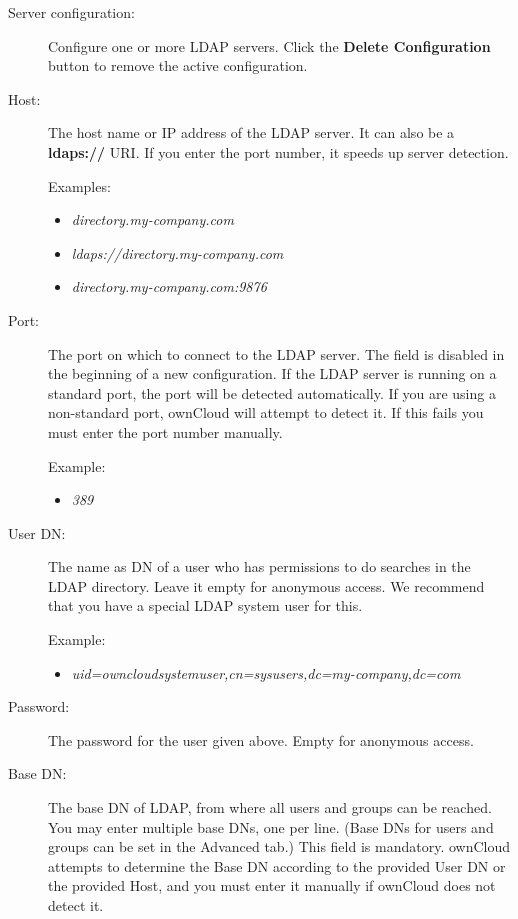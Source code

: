 \documentclass[letterpaper,10pt,english]{sphinxmanual}
\begin{document}
\begin{description}
\item[{Server configuration:}] \leavevmode
Configure one or more LDAP servers. Click the \textbf{Delete Configuration}
button to remove the active configuration.

\item[{Host:}] \leavevmode
The host name or IP address of the LDAP server. It can also be a \textbf{ldaps://}
URI. If you enter the port number, it speeds up server detection.

Examples:
\begin{itemize}
\item {} 
\emph{directory.my-company.com}

\item {} 
\emph{ldaps://directory.my-company.com}

\item {} 
\emph{directory.my-company.com:9876}

\end{itemize}

\item[{Port:}] \leavevmode
The port on which to connect to the LDAP server. The field is disabled in the
beginning of a new configuration. If the LDAP server is running on a standard
port, the port will be detected automatically. If you are using a
non-standard port, ownCloud will attempt to detect it. If this fails you must
enter the port number manually.

Example:
\begin{itemize}
\item {} 
\emph{389}

\end{itemize}

\item[{User DN:}] \leavevmode
The name as DN of a user who has permissions to do searches in the LDAP
directory. Leave it empty for anonymous access. We recommend that you have a
special LDAP system user for this.

Example:
\begin{itemize}
\item {} 
\emph{uid=owncloudsystemuser,cn=sysusers,dc=my-company,dc=com}

\end{itemize}

\item[{Password:}] \leavevmode
The password for the user given above. Empty for anonymous access.

\item[{Base DN:}] \leavevmode
The base DN of LDAP, from where all users and groups can be reached. You may
enter multiple base DNs, one per line. (Base DNs for users and groups can be
set in the Advanced tab.) This field is mandatory. ownCloud attempts to
determine the Base DN according to the provided User DN or the provided
Host, and you must enter it manually if ownCloud does not detect it.


\end{description}
\end{document}
